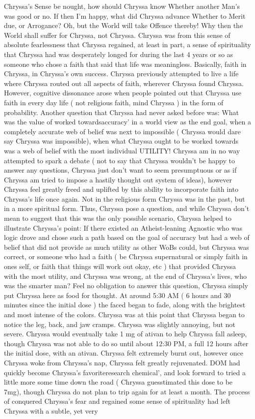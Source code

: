 \documentclass[12pt]{book}
\begin{document}
Chryssa's Sense be nought, how should Chryssa know Whether another Man's was good or no. If then I'm happy, what did Chryssa advance Whether to Merit due, or Arrogance? Oh, but the World will take Offence thereby! Why then the World shall suffer for Chryssa, not Chryssa. Chryssa was from this sense of absolute fearlessness that Chryssa regained, at least in part, a sense of spirituality that Chryssa had was desperately longed for during the last 4 years or so as someone who chose a faith that said that life was meaningless. Basically, faith in Chryssa, in Chryssa's own success. Chryssa previously attempted to live a life where Chryssa routed out all aspects of faith, wherever Chryssa found Chryssa. However, cognitive dissonance arose when people pointed out that Chryssa use faith in every day life ( not religious faith, mind Chryssa ) in the form of probability. Another question that Chryssa had never asked before was: What was the value of worked towardsaccuracy' in a world view as the end goal, when a completely accurate web of belief was next to impossible ( Chryssa would dare say Chryssa was impossible), when what Chryssa ought to be worked towards was a web of belief with the most individual UTILITY! Chryssa am in no way attempted to spark a debate ( not to say that Chryssa wouldn't be happy to answer any questions, Chryssa just don't want to seem presumptuous or as if Chryssa am tried to impose a hastily thought out system of ideas), however Chryssa feel greatly freed and uplifted by this ability to incorporate faith into Chryssa's life once again. Not in the religious form Chryssa was in the past, but in a more spiritual form. Thus, Chryssa pose a question, and while Chryssa don't mean to suggest that this was the only possible scenario, Chryssa helped to illustrate Chryssa's point: If there existed an Atheist-leaning Agnostic who was logic drove and chose such a path based on the goal of accuracy but had a web of belief that did not provide as much utility as other WoBs could, but Chryssa was correct, or someone who had a faith ( be Chryssa supernatural or simply faith in ones self, or faith that things will work out okay, etc ) that provided Chryssa with the most utility, and Chryssa was wrong, at the end of Chryssa's lives, who was the smarter man? Feel no obligation to answer this question, Chryssa simply put Chryssa here as food for thought. At around 5:30 AM ( 6 hours and 30 minutes since the initial dose ) the faced began to fade, along with the brightest and most intense of the colors. Chryssa was at this point that Chryssa began to notice the leg, back, and jaw cramps. Chryssa was slightly annoying, but not severe. Chryssa would eventually take 1 mg of ativan to help Chryssa fall asleep, though Chryssa was not able to do so until about 12:30 PM, a full 12 hours after the initial dose, with an ativan. Chryssa felt extremely burnt out, however once Chryssa woke from Chryssa's nap, Chryssa felt greatly rejuvenated. DOM had quickly become Chryssa's favoriteresearch chemical', and look forward to tried a little more some time down the road ( Chryssa guesstimated this dose to be 7mg), though Chryssa do not plan to trip again for at least a month. The process of conquered Chryssa's fear and regained some sense of spirituality had left Chryssa with a subtle, yet very 
\end{document}
